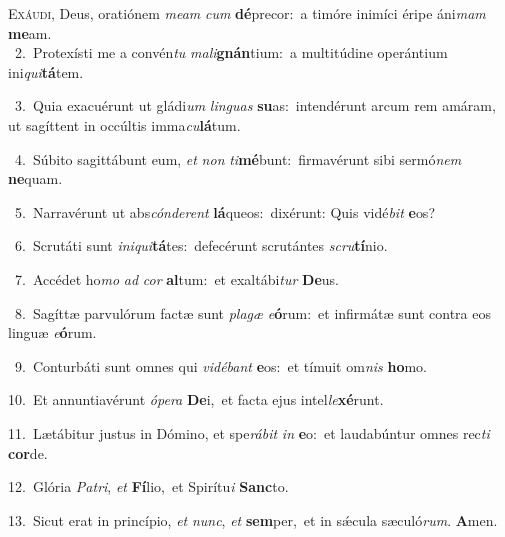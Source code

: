 \lettrine{\initial\textcolor{\initialcolor}{E}}{xáudi,} Deus, oratiónem \textit{me}\-\textit{am} \textit{cum} \textbf{dé}\-precor:~\star a timóre inimíci éripe áni\textit{mam} \textbf{me}\-am.\\
{\numbfont\textcolor{\numbcolor}{~2.}}~Protexísti me a convén\textit{tu} \textit{ma}\-\textit{li}\textbf{gnán}tium:~\star a multitúdine operántium ini\-\textit{qui}\-\textbf{tá}tem.\par
{\numbfont\textcolor{\numbcolor}{~3.}}~Quia exacuérunt ut gládi\textit{um} \textit{lin}\-\textit{guas} \textbf{su}\-as:~\star intendérunt arcum rem amáram, ut sagíttent in occúltis imma\-\textit{cu}\-\textbf{lá}tum.\par
{\numbfont\textcolor{\numbcolor}{~4.}}~Súbito sagittábunt eum, \textit{et} \textit{non} \textit{ti}\-\textbf{mé}bunt:~\star firmavérunt sibi sermó\textit{nem} \textbf{ne}\-quam.\par
{\numbfont\textcolor{\numbcolor}{~5.}}~Narravérunt ut abs\-\textit{cón}\-\textit{de}\textit{rent} \textbf{lá}\-queos:~\star dixérunt: Quis vidé\textit{bit} \textbf{e}\-os?\par
{\numbfont\textcolor{\numbcolor}{~6.}}~Scrutáti sunt \textit{in}\-\textit{i}\textit{qui}\textbf{tá}tes:~\star defecérunt scrutántes \textit{scru}\-\textbf{tí}nio.\par
{\numbfont\textcolor{\numbcolor}{~7.}}~Accédet ho\textit{mo} \textit{ad} \textit{cor} \textbf{al}\-tum:~\star et exaltábi\textit{tur} \textbf{De}\-us.\par
{\numbfont\textcolor{\numbcolor}{~8.}}~Sagíttæ parvulórum factæ sunt \textit{pla}\-\textit{gæ} \textit{e}\-\textbf{ó}rum:~\star et infirmátæ sunt contra eos linguæ \textit{e}\-\textbf{ó}rum.\par
{\numbfont\textcolor{\numbcolor}{~9.}}~Conturbáti sunt omnes qui \textit{vi}\-\textit{dé}\textit{bant} \textbf{e}\-os:~\star et tímuit om\textit{nis} \textbf{ho}\-mo.\par
{\numbfont\textcolor{\numbcolor}{10.}}~Et annuntiavérunt \textit{ó}\-\textit{pe}\textit{ra} \textbf{De}\-i,~\star et facta ejus intel\-\textit{le}\-\textbf{xé}runt.\par
{\numbfont\textcolor{\numbcolor}{11.}}~Lætábitur justus in Dómino, et spe\-\textit{rá}\-\textit{bit} \textit{in} \textbf{e}\-o:~\star et laudabúntur omnes rec\textit{ti} \textbf{cor}\-de.\par
{\numbfont\textcolor{\numbcolor}{12.}}~Glória \textit{Pa}\-\textit{tri}, \textit{et} \textbf{Fí}\-lio,~\star et Spirítu\textit{i} \textbf{Sanc}\-to.\par
{\numbfont\textcolor{\numbcolor}{13.}}~Sicut erat in princípio, \textit{et} \textit{nunc}\-, \textit{et} \textbf{sem}\-per,~\star et in sǽcula sæculó\-\textit{rum}\-. \textbf{A}\-men.\par
